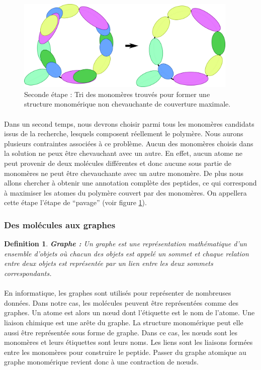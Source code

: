 \documentclass[12pt,french,twoside]{report}
\begin{document}
\begin{figure}[!ht]
  \begin{center}
    \includegraphics[width=400px]{Figures/s2m/Intro/tiling.png}
    \caption{\label{tiling_fig}Seconde étape : Tri des monomères trouvés pour former une structure monomérique non chevauchante de couverture maximale.}
  \end{center}
\end{figure}

\paragraph{}Dans un second temps, nous devrons choisir parmi tous les monomères candidats issus de la recherche, lesquels composent réellement le polymère.
Nous aurons plusieurs contraintes associées à ce problème.
Aucun des monomères choisis dans la solution ne peux être chevauchant avec un autre.
En effet, aucun atome ne peut provenir de deux molécules différentes et donc aucune sous partie de monomères ne peut être chevauchante avec un autre monomère.
De plus nous allons chercher à obtenir une annotation complète des peptides, ce qui correspond à maximiser les atomes du polymère couvert par des monomères.
On appellera cette étape l'étape de ``pavage'' (voir figure \ref{tiling_fig}).

\subsubsection{Des molécules aux graphes}

\newtheorem{definition}{Definition}
\begin{definition}\textbf{Graphe :}
 Un graphe est une représentation mathématique d'un ensemble d'objets où chacun des objets est appelé un sommet et
 chaque relation entre deux objets est représentée par un lien entre les deux sommets correspondants.
\end{definition}

\paragraph{}En informatique, les graphes sont utilisés pour représenter de nombreuses données.
Dans notre cas, les molécules peuvent être représentées comme des graphes.
Un atome est alors un n\oe{}ud dont l'étiquette est le nom de l'atome.
Une liaison chimique est une arête du graphe.
La structure monomérique peut elle aussi être représentée sous forme de graphe.
Dans ce cas, les n\oe{}uds sont les monomères et leurs étiquettes sont leurs noms.
Les liens sont les liaisons formées entre les monomères pour construire le peptide.
Passer du graphe atomique au graphe monomérique revient donc à une contraction de n\oe{}uds.
\end{document}
